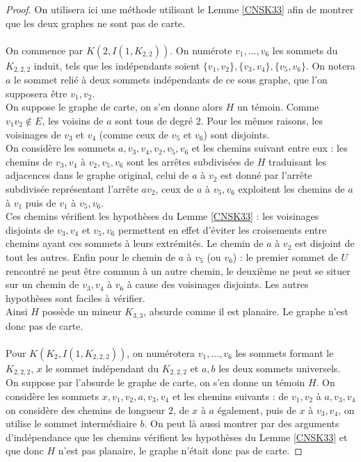 \documentclass{scrartcl}
\begin{document}
\begin{flushleft}
\begin{proof}
    On utilisera ici une méthode utilisant le Lemme \ref{CNSK33} afin de montrer que les deux graphes ne sont pas de carte.
    \\~\\
    On commence par $K(2, I(1, K_{2,2}))$.
    On numérote $v_1, ..., v_6$ les sommets du $K_{2,2,2}$ induit, tels que les indépendants soient $\{v_1, v_2\}, \{v_3,v_4\}, \{v_5,v_6\}$.
    On notera $a$ le sommet relié à deux sommets indépendants de ce sous graphe, que l'on supposera être $v_1, v_2$.\\
    On suppose le graphe de carte, on s'en donne alors $H$ un témoin. Comme $v_1v_2 \notin E$, les voisins de $a$ sont tous de degré
    $2$. Pour les mêmes raisons, les voisinages de $v_3$ et $v_4$ (comme ceux de $v_5$ et $v_6$) sont disjoints.\\
    On considère les sommets $a, v_3, v_4, v_2, v_5, v_6$ et les chemins suivant entre eux : les chemins de $v_3, v_4$ à $v_2, v_5, v_6$
    sont les arrêtes subdivisées de $H$ traduisant les adjacences dans le graphe original, celui de $a$ à $v_2$ est donné par l'arrête
    subdivisée représentant l'arrête $av_2$, ceux de $a$ à $v_5, v_6$ exploitent les chemins de $a$ à $v_1$ puis de $v_1$ à $v_5, v_6$.\\
    Ces chemins vérifient les hypothèses du Lemme \ref{CNSK33} : les voisinages disjoints de $v_3, v_4$ et $v_5, v_6$ permettent
    en effet d'éviter les croisements entre chemins ayant ces sommets à leurs extrémités. Le chemin de $a$ à $v_2$ est disjoint
    de tout les autres. Enfin pour le chemin de $a$ à $v_5$ (ou $v_6$) : le premier sommet de $U$ rencontré ne peut être commun à un autre
    chemin, le deuxième ne peut se situer sur un chemin de $v_3, v_4$ à $v_6$ à cause des voisinages disjoints. Les autres hypothèses sont
    faciles à vérifier.\\
    Ainsi $H$ possède un mineur $K_{3,3}$, absurde comme il est planaire. Le graphe n'est donc pas de carte.
    \\~\\
    Pour $K(K_2, I(1, K_{2,2,2}))$, on numérotera $v_1, ..., v_6$ les sommets formant le $K_{2,2,2}$, $x$ le sommet indépendant du $K_{2,2,2}$
    et $a, b$ les deux sommets universels. On suppose par l'absurde le graphe de carte, on s'en donne un témoin $H$. On considère les sommets
    $x, v_1, v_2, a, v_3, v_4$ et les chemins suivants : de $v_1, v_2$ à $a, v_3, v_4$ on considère des chemins de longueur $2$, de
    $x$ à $a$ également, puis de $x$ à $v_3, v_4$, on utilise le sommet intermédiaire $b$. On peut là aussi montrer par des arguments
    d'indépendance que les chemins vérifient les hypothèses du Lemme \ref{CNSK33} et que donc $H$ n'est pas planaire, le graphe
    n'était donc pas de carte.
\end{proof}


\end{flushleft}
\end{document}
